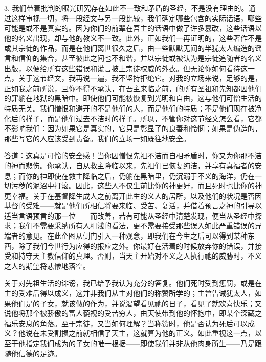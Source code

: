 3. 我们带着批判的眼光研究存在如此不一致和矛盾的圣经，不是没有理由的。通过这样审视一切，将一段经文与另一段比较，我们确定哪些包含的实际话语，哪些可能是或不是真实的。因为你们的前辈在吾主的话语中做了许多篡改，这些话语以他的名义出现，却与他的教义不一致。此外，正如我们一再证明的，这些著作不是或其宗徒的作品，而是在他们离世很久之后，由一些默默无闻的半犹太人编造的谣言和信仰的集合，甚至彼此之间也不和谐，并以宗徒或被认为是宗徒追随者的名义出版，以便给所有这些错误和谎言披上宗徒权威的外衣。但无论你如何看待这一点，关于这节经文，我再说一遍，我不坚持拒绝它。对我的立场来说，足够的是，正如我之前所说，且你不得不承认，在吾主来临之前，的所有圣祖和先知都因他们的罪躺在地狱的黑暗中。即使他们可能被恢复到光明和自由，这与他们可憎生活的特质无关。我们憎恨和避开的不是他们的人，而是他们的特质；不是他们现在被净化后的样子，而是他们过去不洁时的样子。所以，不管你对这节经文怎么看，它都不影响我们：因为如果它是真实的，它只是彰显了的良善和怜悯；如果是伪造的，那些写它的人应该受到责备。我们的立场一如既往地安全。\par

答道：这真是可怜的安全感！当你因憎恨先祖不洁而自相矛盾时，你又为你那不洁的神而悲伤。你承认，自从救主降临以来，先祖们已恢复纯洁，并享有真福者的安息；而你的神即使在救主降临之后，仍躺在黑暗里，仍沉溺于不义的海洋，仍在一切污秽的泥沼中打滚。因此，这些人不仅生前比你的神更好，而且死时也比你的神更幸福。关于在基督降生成人之前离开此生的义人的居所，以及他们的状况是否因基督的受难——就是他们所相信将要来临、受苦、复活，并借着预言之神的引导以适当言语预言的那一位——而改善，若有可能从圣经中清楚发现，便当从圣经中探求；我们不需要采纳所有人粗浅的看法，更不需要接受那些误入如此严重错误的异端者的意见。在此企图从侧门引入一种观念，即我们在今生之后可以得到某种东西，除了我们今世行为应得的报应之外。你最好在活着的时候放弃你的错误，并接受和持守天主教信仰的真理。否则，当天主开始对不义之人执行祂的威胁时，不义之人的期望将悲惨地落空。\par

关于对先祖生活的诽谤，我已给予我认为充分的答复。他们死时受到惩罚，或是在主的受难后得以成义，这并非我们从主对他们的称赞所学的；主曾告诫犹太人，如果他们是的子女，就该做的作为，并说渴望看见祂的日子，看见了就欢喜快乐；又说他将那个被骄傲的富人藐视的受苦穷人，由天使带到他的怀抱中，即某个深藏之福乐安息的角落。至于宗徒，又当如何理解？当称赞时，他是否认为死后可以成义？他说在未受割损之前就相信了天主，这就算为他的正义。如此重视这一点，以至于他指定我们成为的子女的唯一根据——即使我们并非从他肉身所生——乃是跟随他信德的足迹。\par

